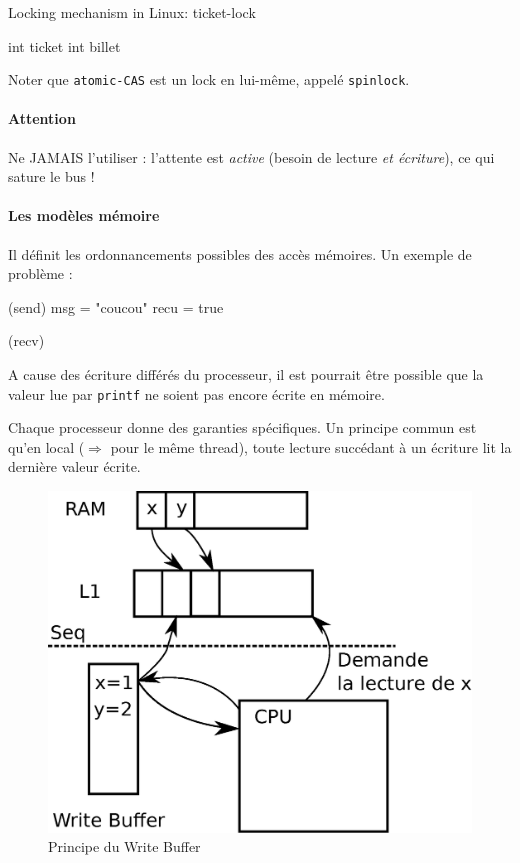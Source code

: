 \documentclass{article}
\begin{document}
Locking mechanism in Linux: ticket-lock\\
\begin{algorithm}[H]
int ticket\;
int billet\;

\end{algorithm}

Noter que \texttt{atomic-CAS} est un lock en lui-même, appelé \texttt{spinlock}.
\begin{algorithm}
\end{algorithm}
\paragraph{Attention} Ne JAMAIS l'utiliser : l'attente est \emph{active} (besoin de lecture \emph{et écriture}), ce qui sature le bus !


\paragraph{Les modèles mémoire}
Il définit les ordonnancements possibles des accès mémoires. Un exemple de problème :

\begin{algorithm}[H]
\Label(send){
	msg = "coucou"\;
	recu = true\;
}

\Label(recv){
}
\end{algorithm}
A cause des écriture différés du processeur, il est pourrait être possible que la valeur lue par \texttt{printf} ne soient pas encore écrite en mémoire.
\bigskip

Chaque processeur donne des garanties spécifiques. Un principe commun est qu'en local ($\Rightarrow$ pour le même thread), toute lecture succédant à un écriture lit la dernière valeur écrite.

\begin{figure}[h]
\centering
\includegraphics[width=0.5\linewidth]{write_buffer.eps}
\caption{\label{fig:write_buffer}Principe du Write Buffer}
\end{figure}
\end{document}
